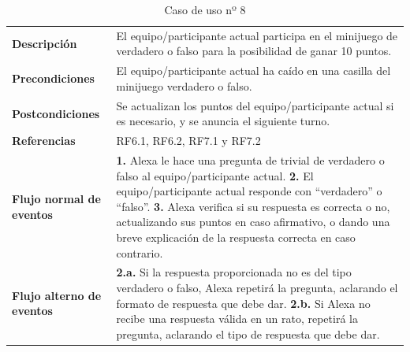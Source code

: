 \begin{table}[H]
	\centering
	\begin{tabular}{|p{3cm}|p{12cm}|}
		\hline
		\rowcolor{lightgray}
		\multicolumn{2}{|c|}{\textbf{CU08}: Minijuego verdadero o falso} \\
		\hline
		\textbf{Descripción} & El equipo/participante actual participa en el minijuego de verdadero o falso para la posibilidad de ganar 10 puntos. \vspace{0.2cm} \\
		\hline
		\textbf{Precondiciones} & El equipo/participante actual ha caído en una casilla del minijuego verdadero o falso. \vspace{0.2cm} \\
		\hline
		\textbf{Postcondiciones} & Se actualizan los puntos del equipo/participante actual si es necesario, y se anuncia el siguiente turno. \vspace{0.2cm} \\
		\hline
		\textbf{Referencias} & RF6.1, RF6.2, RF7.1 y RF7.2 \vspace{0.2cm} \\
		\hline
		\textbf{Flujo normal de eventos} &
		\textbf{1.} Alexa le hace una pregunta de trivial de verdadero o falso al equipo/participante actual. \newline
		\vspace{0.2cm}
		\textbf{2.} El equipo/participante actual responde con \enquote{verdadero} o \enquote{falso}. \newline
		\vspace{0.2cm}
		\textbf{3.} Alexa verifica si su respuesta es correcta o no, actualizando sus puntos en caso afirmativo, o dando una breve explicación de la respuesta correcta en caso contrario. \newline
		\vspace{0.2cm} \\
		\hline
		\textbf{Flujo alterno de eventos} &
		\textbf{2.a.} Si la respuesta proporcionada no es del tipo verdadero o falso, Alexa repetirá la pregunta, aclarando el formato de respuesta que debe dar. \newline
		\vspace{0.2cm} 
		\textbf{2.b.} Si Alexa no recibe una respuesta válida en un rato, repetirá la pregunta, aclarando el tipo de respuesta que debe dar. \vspace{0.2cm} \\
		\hline
	\end{tabular}
	\caption{Caso de uso nº 8}
	\label{tab:CU08}
\end{table}

